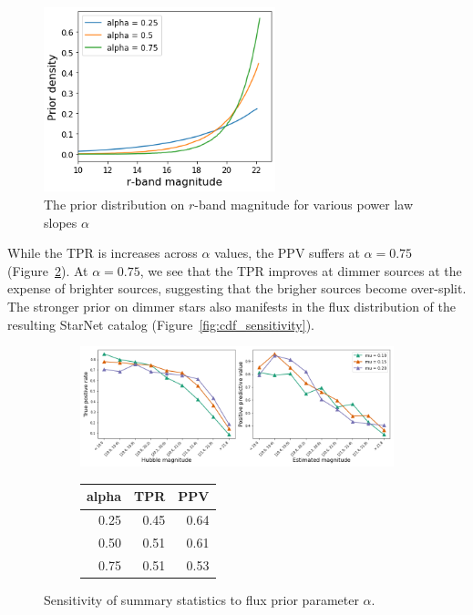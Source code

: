 \begin{figure}[!h]
    \centering
    \includegraphics[width = 0.6\textwidth]{figures/prior_fluxes.png}
    \caption{The prior distribution on $r$-band magnitude for various power law slopes $\alpha$}
    \label{fig:flux_priors}
\end{figure}

While the TPR is increases across $\alpha$ values, the PPV suffers at $\alpha = 0.75$ (Figure~\ref{fig:alpha_sensitivity}).
At $\alpha = 0.75$, we see that the TPR improves at dimmer sources at the expense of brighter sources, suggesting that the brigher sources become over-split. 
The stronger prior on dimmer stars also manifests in the flux distribution of the resulting StarNet catalog (Figure~\ref{fig:cdf_sensitivity}). 

\begin{figure}[ht]
\begin{subfigure}{\textwidth}
\centering
\includegraphics[width = \textwidth]{figures/prior_alpha_sensitivty.png}
\end{subfigure}
\begin{subfigure}{\textwidth}
\begin{center}
\begin{tabular}{rrr}
\toprule
 alpha &   TPR &   PPV \\
\midrule
  0.25 &  0.45 &  0.64 \\
  0.50 &  0.51 &  0.61 \\
  0.75 &  0.51 &  0.53 \\
\bottomrule
\end{tabular}
\par\vspace{0pt}
\end{center}
\end{subfigure}\hfill
\caption{Sensitivity of summary statistics to flux prior parameter $\alpha$. }
\label{fig:alpha_sensitivity}
\end{figure}

